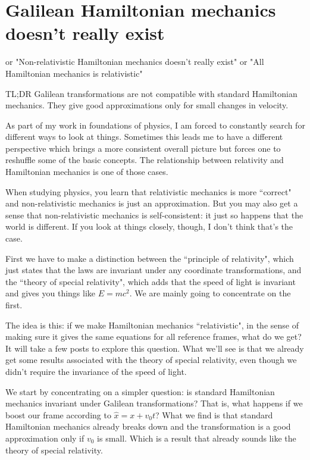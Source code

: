 \documentclass[aps,pra,10pt,floatfix,nofootinbib]{revtex4-1}
\theoremstyle{definition}
\begin{document}
\section{Galilean Hamiltonian mechanics doesn't really exist}

or "Non-relativistic Hamiltonian mechanics doesn't really exist"
or "All Hamiltonian mechanics is relativistic"

TL;DR Galilean transformations are not compatible with standard Hamiltonian mechanics. They give good approximations only for small changes in velocity.

As part of my work in foundations of physics, I am forced to constantly search for different ways to look at things. Sometimes this leads me to have a different perspective which brings a more consistent overall picture but forces one to reshuffle some of the basic concepts. The relationship between relativity and Hamiltonian mechanics is one of those cases.

When studying physics, you learn that relativistic mechanics is more ``correct" and non-relativistic mechanics is just an approximation. But you may also get a sense that non-relativistic mechanics is self-consistent: it just so happens that the world is different. If you look at things closely, though, I don't think that's the case.

First we have to make a distinction between the ``principle of relativity", which just states that the laws are invariant under any coordinate transformations, and the ``theory of special relativity", which adds that the speed of light is invariant and gives you things like $E=mc^2$. We are mainly going to concentrate on the first.

The idea is this: if we make Hamiltonian mechanics ``relativistic", in the sense of making sure it gives the same equations for all reference frames, what do we get? It will take a few posts to explore this question. What we'll see is that we already get some results associated with the theory of special relativity, even though we didn't require the invariance of the speed of light.

We start by concentrating on a simpler question: is standard Hamiltonian mechanics invariant under Galilean transformations? That is, what happens if we boost our frame according to $\hat{x}=x+ v_0 t$? What we find is that standard Hamiltonian mechanics already breaks down and the transformation is a good approximation only if $v_0$ is small. Which is a result that already sounds like the theory of special relativity.
\end{document}
